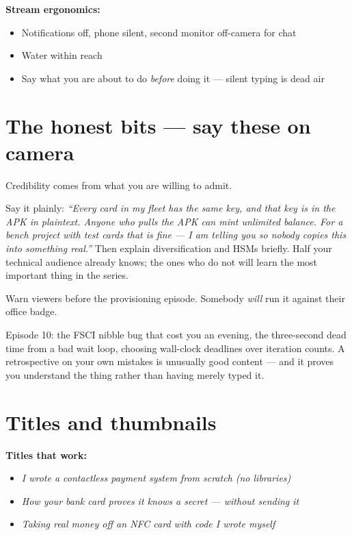 \textbf{Stream ergonomics:}
\begin{itemize}[label=$\square$]
  \item Notifications off, phone silent, second monitor off-camera for chat
  \item Water within reach
  \item Say what you are about to do \emph{before} doing it --- silent typing is
        dead air
\end{itemize}

\section{The honest bits --- say these on camera}

Credibility comes from what you are willing to admit.

\begin{description}[leftmargin=0pt, style=nextline]
  \item[1. The keys are hardcoded and that is not secure.] Say it plainly:
        \emph{``Every card in my fleet has the same key, and that key is in the
        APK in plaintext. Anyone who pulls the APK can mint unlimited balance. For
        a bench project with test cards that is fine --- I am telling you so
        nobody copies this into something real.''} Then explain diversification
        and HSMs briefly. Half your technical audience already knows; the ones who
        do not will learn the most important thing in the series.
  \item[2. Cards can be destroyed.] Warn viewers before the provisioning episode.
        Somebody \emph{will} run it against their office badge.
  \item[3. What you would change.] Episode 10: the FSCI nibble bug that cost you
        an evening, the three-second dead time from a bad wait loop, choosing
        wall-clock deadlines over iteration counts. A retrospective on your own
        mistakes is unusually good content --- and it proves you understand the
        thing rather than having merely typed it.
\end{description}

\section{Titles and thumbnails}

\textbf{Titles that work:}
\begin{itemize}
  \item \emph{I wrote a contactless payment system from scratch (no libraries)}
  \item \emph{How your bank card proves it knows a secret --- without sending it}
  \item \emph{Taking real money off an NFC card with code I wrote myself}
\end{itemize}

